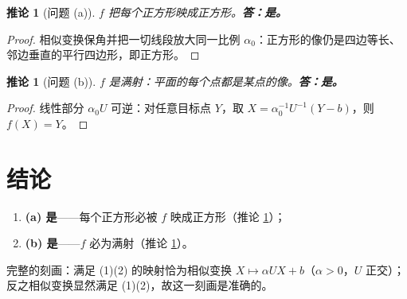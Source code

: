 \documentclass[12pt,a4paper]{ctexart}
\theoremstyle{ding}
\newtheorem{kor}[lemma]{推论}
\theoremstyle{definition}
\begin{document}
\begin{kor}[问题 (a)]\label{kor:a}
$f$ 把每个正方形映成正方形。\textbf{答：是。}
\end{kor}
\begin{proof}
相似变换保角并把一切线段放大同一比例 $\alpha_0$：正方形的像仍是四边等长、邻边垂直的平行四边形，即正方形。
\end{proof}

\begin{kor}[问题 (b)]\label{kor:b}
$f$ 是满射：平面的每个点都是某点的像。\textbf{答：是。}
\end{kor}
\begin{proof}
线性部分 $\alpha_0 U$ 可逆：对任意目标点 $Y$，取 $X=\alpha_0^{-1}U^{-1}(Y-b)$，则 $f(X)=Y$。
\end{proof}

\section{结论}
\begin{enumerate}
  \item \textbf{(a) 是}——每个正方形必被 $f$ 映成正方形（推论 \ref{kor:a}）；
  \item \textbf{(b) 是}——$f$ 必为满射（推论 \ref{kor:b}）。
\end{enumerate}
完整的刻画：满足 (1)(2) 的映射恰为相似变换 $X\mapsto\alpha UX+b$（$\alpha>0$，$U$ 正交）；反之相似变换显然满足 (1)(2)，故这一刻画是准确的。

\bigskip
\begin{center}
\end{center}
\end{document}
